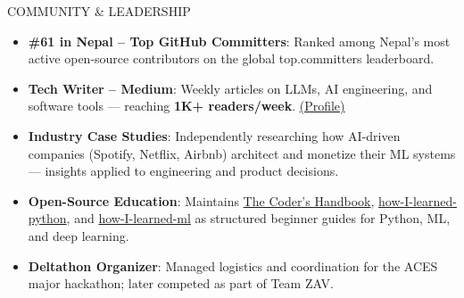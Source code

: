 \documentclass{resume}
\begin{document}
\begin{rSection}{COMMUNITY \& LEADERSHIP}
\begin{itemize} \itemsep -3pt {}
    \item \textbf{\#61 in Nepal – Top GitHub Committers}: Ranked among Nepal's most active open-source contributors on the global top.committers leaderboard.
    \item \textbf{Tech Writer – Medium}: Weekly articles on LLMs, AI engineering, and software tools — reaching \textbf{1K+ readers/week}. \href{https://medium.com/@abhiverse01}{(Profile)}
    \item \textbf{Industry Case Studies}: Independently researching how AI-driven companies (Spotify, Netflix, Airbnb) architect and monetize their ML systems — insights applied to engineering and product decisions.
    \item \textbf{Open-Source Education}: Maintains \href{https://github.com/abhiverse01/the-coders-handbook}{The Coder's Handbook}, \href{https://github.com/abhiverse01/how-I-learned-python}{how-I-learned-python}, and \href{https://github.com/abhiverse01/how-I-learned-ml-repo}{how-I-learned-ml} as structured beginner guides for Python, ML, and deep learning.
    \item \textbf{Deltathon Organizer}: Managed logistics and coordination for the ACES major hackathon; later competed as part of Team ZAV.
\end{itemize}
\end{rSection}
\end{document}
